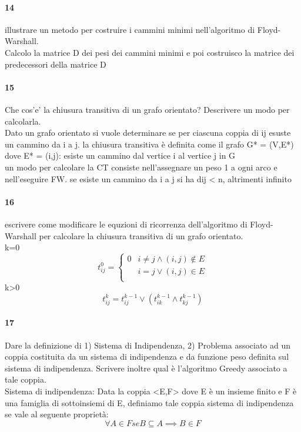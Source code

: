 \documentclass[12pt, a4paper, openany]{book}
\begin{document}
\paragraph{14}
illustrare un metodo per costruire i cammini minimi nell’algoritmo di Floyd-Warshall.\\
Calcolo la matrice D dei pesi dei cammini minimi e poi costruisco la matrice dei predecessori della matrice D
\paragraph{15}
Che cos’e’ la chiusura transitiva di un grafo orientato? Descrivere un modo
per calcolarla.\\
Dato un grafo orientato si vuole determinare se per ciascuna coppia di ij esuste un cammino da i a j. la chiusura transitiva è definita come il grafo G* = (V,E*) dove E* = {(i,j): esiste un cammino dal vertice i al vertice j in G}\\
un modo per calcolare la CT consiste nell'assegnare un peso 1 a ogni arco e nell'eseguire FW. se esiste un cammino da i a j si ha dij < n, altrimenti infinito
\paragraph{16}
escrivere come modificare le equzioni di ricorrenza dell’algoritmo di Floyd-Warshall per calcolare la chiusura transitiva di un grafo orientato.\\
k=0
\begin{equation*}
	t_{ij}^0 = \begin{cases}
		0  & i \neq j \land (i,j) \notin E \\
		\  & i = j \lor (i,j) \in E        \\
	\end{cases}
\end{equation*}
k>0
\begin{equation*}
	t_{ij}^k = t_{ij}^{k-1} \lor (t_{ik}^{k-1} \land t_{kj}^{k-1})
\end{equation*}

\paragraph{17}
Dare la definizione di 1) Sistema di Indipendenza, 2) Problema associato ad
un coppia costituita da un sistema di indipendenza e da funzione peso definita
sul sistema di indipendenza. Scrivere inoltre qual è l’algoritmo Greedy
associato a tale coppia.\\
Sistema di indipendenza: Data la coppia <E,F> dove E è un insieme finito e F è una famiglia di sottoinsiemi di E, definiamo tale coppia sistema di indipendenza se vale al seguente proprietà:
\begin{equation*}
	\forall A \in F se B \subseteq A \implies B \in F
\end{equation*}
\end{document}

